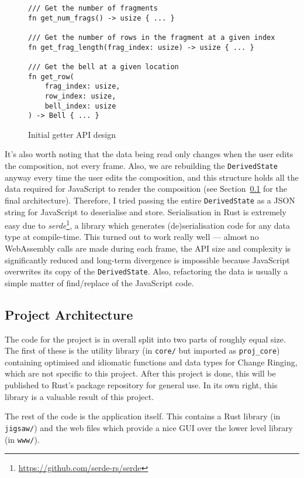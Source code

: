 \documentclass[12pt]{article}
\newcommand{\footurl}[1]{\footnote{\url{#1}}}
\begin{document}
\begin{figure}
    \begin{verbatim}
/// Get the number of fragments
fn get_num_frags() -> usize { ... }

/// Get the number of rows in the fragment at a given index
fn get_frag_length(frag_index: usize) -> usize { ... }

/// Get the bell at a given location
fn get_row(
    frag_index: usize,
    row_index: usize,
    bell_index: usize
) -> Bell { ... }
    \end{verbatim}
    \caption{Initial getter API design}\label{fig:initial_api}
\end{figure}

It's also worth noting that the data being read only changes when the user edits the composition,
not every frame.  Also, we are rebuilding the \verb|DerivedState| anyway every time the user edits
the composition, and this structure holds all the data required for JavaScript to render the
composition (see Section~\ref{sec:proj_arch} for the final architecture).  Therefore, I tried
passing the entire \verb|DerivedState| as a JSON string for JavaScript to deserialise and store.
Serialisation in Rust is extremely easy due to
\emph{serde}\footurl{https://github.com/serde-rs/serde}, a library which generates
(de)serialisation code for any data type at compile-time.  This turned out to work really well ---
almost no WebAssembly calls are made during each frame, the API size and complexity is significantly
reduced and long-term divergence is impossible because JavaScript overwrites its copy of the
\verb|DerivedState|.  Also, refactoring the data is usually a simple matter of find/replace of the
JavaScript code.  

\subsection{Project Architecture}\label{sec:proj_arch}

The code for the project is in overall split into two parts of roughly equal size.  The first of
these is the utility library (in \verb|core/| but imported as \verb|proj_core|) containing optimised
and idiomatic functions and data types for Change Ringing, which are not specific to this project.
After this project is done, this will be published to Rust's package repository for general use.  In
its own right, this library is a valuable result of this project.

The rest of the code is the application itself.  This contains a Rust library (in \verb|jigsaw/|)
and the web files which provide a nice GUI over the lower level library (in \verb|www/|).
\end{document}
